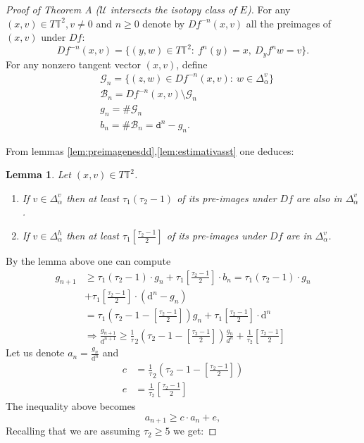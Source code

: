 \documentclass[11pt,letterpaper,reqno]{article}
\newtheorem{lemma}{Lemma}[section]
\newcommand{\Tor}{\mathbb{T}^2}
\newcommand{\TT}{\mathbb{T}^2}
\newcommand{\Deh}{\Delta_{\alpha}^h}
\newcommand{\Dev}{\Delta_{\alpha}^v}
\begin{document}
\begin{proof}[Proof of Theorem A ($\mathcal U$ intersects the isotopy class of $E$)]

For any $(x,v)\in T\Tor, v\neq 0$ and $n\geq 0$ denote by $Df^{-n}(x,v)$ all the preimages of $(x,v)$ under $Df$:
$$Df^{-n}(x,v)=\{(y,w)\in T\TT:\ f^n(y)=x,\ D_yf^nw=v\}.$$
For any nonzero tangent vector $(x,v)$, define
\begin{align}
&\mathcal{G}_n=\{(z,w)\in Df^{-n}(x,v):\ w\in\Dev\}\\
&\mathcal{B}_n=Df^{-n}(x,v)\setminus\mathcal G_n\\
&g_n=\#\mathcal{G}_n\\
&b_n=\#\mathcal{B}_n=\mathtt d^{n}-g_n.
\end{align}
\color{black}

From lemmas \ref{lem:preimagenesdd},\ref{lem:estimativasst} one deduces:

\begin{lemma}\label{lem:good}
Let $(x,v)\in T\Tor$.
\begin{enumerate}
	\item If $v\in\Dev$  then at least $\tau_1(\tau_2-1)$ of its pre-images under $Df$ are also in $\Dev$.
	\item If $v\in\Deh$  then at least $\tau_1\left[\frac{\tau_2-1}2\right]$ of its pre-images under $Df$ are in $\Dev$.
\end{enumerate}
\end{lemma}


By the lemma above one can compute 
\begin{align*}
g_{n+1}&\geq \tau_1(\tau_2-1)\cdot g_n+\tau_1\left[\frac{\tau_2-1}{2}\right]\cdot b_n= \tau_1(\tau_2-1)\cdot g_n\\
&+\tau_1\left[\frac{\tau_2-1}{2}\right]\cdot(\mathrm d^n-g_n)\\
&=\tau_1\left(\tau_2-1-\left[ \frac{\tau_2-1}{2}\right]\right)g_n+\tau_1\left[\frac{\tau_2-1}{2}\right]\cdot\mathrm d^n\\
&\Rightarrow \frac{g_{n+1}}{\mathrm d^{n+1}}\geq \frac 1\tau_2\left(\tau_2-1-\left[ \frac{\tau_2-1}{2}\right]\right)\frac{g_n}{d^n}+\frac 1{\tau_2}\left[\frac{\tau_2-1}{2}\right]
\end{align*}
Let us denote $a_n=\frac{g_n}{\mathrm d^{n}}$  and 
\begin{align*}
c&=\frac 1\tau_2\left(\tau_2-1-\left[ \frac{\tau_2-1}{2}\right]\right)\\
e&=\frac 1{\tau_2}\left[\frac{\tau_2-1}{2}\right]
\end{align*}
The inequality above becomes 
\[
	a_{n+1}\geq c\cdot a_n+e,
\]
Recalling that we are assuming $\tau_2\geq 5$ we get:


\end{proof}
\end{document}
